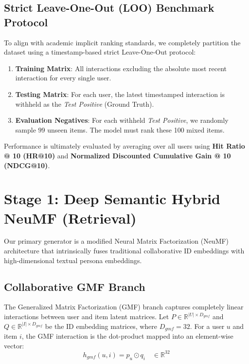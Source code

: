 \documentclass[11pt,a4paper]{article}
\begin{document}
\subsection{Strict Leave-One-Out (LOO) Benchmark Protocol}
To align with academic implicit ranking standards, we completely partition the dataset using a timestamp-based strict Leave-One-Out protocol:
\begin{enumerate}
    \item \textbf{Training Matrix}: All interactions excluding the absolute most recent interaction for every single user.
    \item \textbf{Testing Matrix}: For each user, the latest timestamped interaction is withheld as the \textit{Test Positive} (Ground Truth).
    \item \textbf{Evaluation Negatives}: For each withheld \textit{Test Positive}, we randomly sample $99$ unseen items. The model must rank these 100 mixed items.
\end{enumerate}
Performance is ultimately evaluated by averaging over all users using \textbf{Hit Ratio @ 10 (HR@10)} and \textbf{Normalized Discounted Cumulative Gain @ 10 (NDCG@10)}.

\section{Stage 1: Deep Semantic Hybrid NeuMF (Retrieval)}
Our primary generator is a modified Neural Matrix Factorization (NeuMF) architecture that intrinsically fuses traditional collaborative ID embeddings with high-dimensional textual persona embeddings. 

\subsection{Collaborative GMF Branch}
The Generalized Matrix Factorization (GMF) branch captures completely linear interactions between user and item latent matrices. Let $P \in \mathbb{R}^{|U| \times D_{gmf}}$ and $Q \in \mathbb{R}^{|I| \times D_{gmf}}$ be the ID embedding matrices, where $D_{gmf} = 32$.
For a user $u$ and item $i$, the GMF interaction is the dot-product mapped into an element-wise vector:
\begin{equation}
    h_{gmf}(u, i) = p_u \odot q_i \quad \in \mathbb{R}^{32}
\end{equation}
\end{document}
